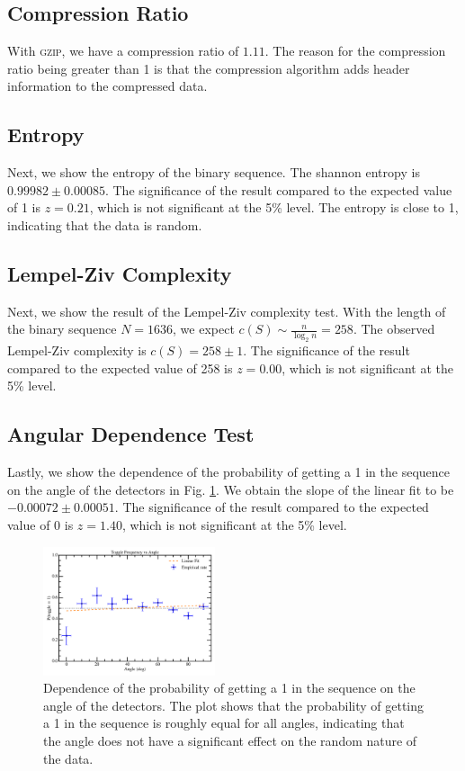 \subsection{Compression Ratio}

With \textsc{gzip}, we have a compression ratio of $1.11$. The reason for the compression ratio being greater than 1 is that the compression algorithm adds header information to the compressed data. 

\subsection{Entropy}

Next, we show the entropy of the binary sequence. The shannon entropy is $0.99982 \pm 0.00085$. The significance of the result compared to the expected value of 1 is $z=0.21$, which is not significant at the 5\% level. The entropy is close to 1, indicating that the data is random.

\subsection{Lempel-Ziv Complexity}

Next, we show the result of the Lempel-Ziv complexity test. With the length of the binary sequence $N=1636$, we expect $c(S) \sim \frac{n}{\log_2 n} = 258$. The observed Lempel-Ziv complexity is $c(S) = 258 \pm 1$. The significance of the result compared to the expected value of 258 is $z=0.00$, which is not significant at the 5\% level. 

\subsection{Angular Dependence Test}

Lastly, we show the dependence of the probability of getting a 1 in the sequence on the angle of the detectors in Fig. \ref{fig:angle_dependence}. We obtain the slope of the linear fit to be $-0.00072 \pm 0.00051$. The significance of the result compared to the expected value of 0 is $z=1.40$, which is not significant at the 5\% level. 

\begin{figure}
\centering
\includegraphics[width=0.45\textwidth]{figure/toggle_vs_angle.png}
\caption{Dependence of the probability of getting a 1 in the sequence on the angle of the detectors. The plot shows that the probability of getting a 1 in the sequence is roughly equal for all angles, indicating that the angle does not have a significant effect on the random nature of the data.}
\label{fig:angle_dependence}
\end{figure}

